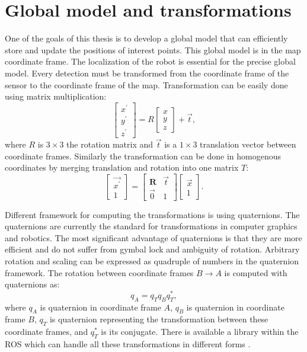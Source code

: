 \section{Global model and transformations}
One of the goals of this thesis is to develop a global model that can efficiently store and update the positions of interest points. This global model is in the map coordinate frame. The localization of the robot is essential for the precise global model. Every detection must be transformed from the coordinate frame of the sensor to the coordinate frame of the map. Transformation can be easily done using matrix multiplication:
\begin{equation}
\begin{bmatrix}
x^\prime \\
y^\prime \\
z^\prime 
\end{bmatrix}
=
R \begin{bmatrix}
x \\
y \\
z
\end{bmatrix}
+ \vec{t},
\end{equation}
where $R$ is $3\times3$ the rotation matrix and $\vec{t}$ is a $1\times3$ translation vector between coordinate frames. Similarly the transformation can be done in homogenous coordinates by merging translation and rotation into one matrix $T$:
\begin{equation}
\begin{bmatrix}
\vec{x^\prime} \\
1
\end{bmatrix}
=
\begin{bmatrix}
 \bm{R} & \vec{t} \\
 \vec{0} &  1
\end{bmatrix}
\begin{bmatrix}
\vec{x}\\
1
\end{bmatrix}.
\end{equation}

Different framework for computing the transformations is using quaternions. The quaternions are currently the standard for transformations in computer graphics and robotics. The most significant advantage of quaternions is that they are more efficient and do not suffer from gymbal lock and ambiguity of rotation. Arbitrary rotation and scaling can be expressed as quadruple of numbers in the quaternion framework. The rotation between coordinate frames $B \to A$ is computed with quaternions as:
\begin{equation}
q_A = q_T q_B q_T^*,
\end{equation}
where $q_A$ is quaternion in coordinate frame $A$, $q_B$ is quaternion in coordinate frame $B$, $q_T$ is quaternion representing the transformation between these coordinate frames, and $q_T^*$ is its conjugate. There is available a library within the ROS which can handle all these transformations in different forms \cite{tf}. 

